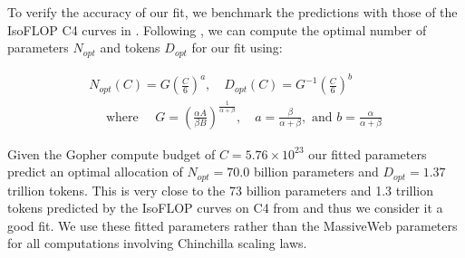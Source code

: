 \documentclass{article}
\begin{document}
To verify the accuracy of our fit, we benchmark the predictions with those of the IsoFLOP C4 curves in \cite{hoffmann2022training}. Following \cite{hoffmann2022training}, we can compute the optimal number of parameters $N_{opt}$ and tokens $D_{opt}$ for our fit using:

\begin{equation}\label{eq:ccoptapp}
\begin{aligned}
N_{opt}(C) = G {\left(\frac{C}{6}\right)}^{a}, \quad
D_{opt}(C) = G^{-1} {\left(\frac{C}{6}\right)}^{b}\\
\quad \text{ where } \quad G = {\left(\frac{\alpha A}{\beta B} \right)}^{\frac{1}{\alpha + \beta}},\quad
a = \frac{\beta}{\alpha+\beta}, \text{ and } b = \frac{\alpha}{\alpha + \beta}
\end{aligned}
\end{equation}

Given the Gopher compute budget of $C=5.76 \times 10^{23}$ our fitted parameters predict an optimal allocation of $N_{opt}=70.0$ billion parameters and $D_{opt}=1.37$ trillion tokens. This is very close to the 73 billion parameters and 1.3 trillion tokens predicted by the IsoFLOP curves on C4 from \cite{hoffmann2022training} and thus we consider it a good fit. We use these fitted parameters rather than the MassiveWeb parameters for all computations involving Chinchilla scaling laws.



\end{document}
